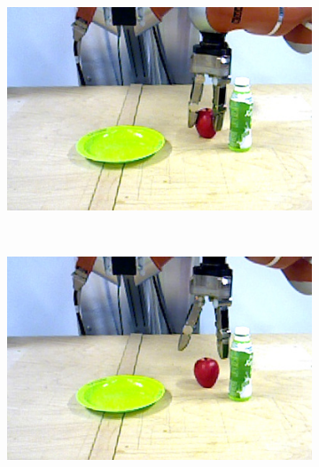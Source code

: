 \begin{figure}[]\ContinuedFloat
  \centering
  \begin{subfigure}[t]{0.475\textwidth}
    \centering
    \includegraphics[width=\textwidth]{./figures/sec/scenario/darktable_exported/frame1095.jpg}
    \label{fig:sec_examplescenario_pickandplace_4j}
  \end{subfigure}
  \hfil
  \begin{subfigure}[t]{0.475\textwidth}
    \centering
    \label{fig:sec_examplescenario_pickandplace_4t}
  \end{subfigure}\\%
  \begin{subfigure}[t]{0.475\textwidth}
    \centering
    \includegraphics[width=\textwidth]{./figures/sec/scenario/darktable_exported/frame1174.jpg}

\end{subfigure}
\end{figure}
